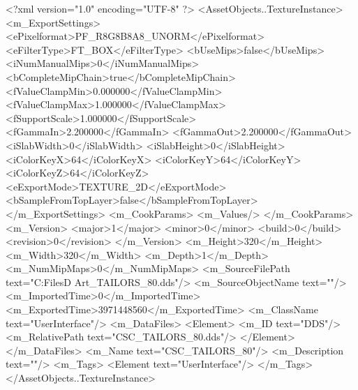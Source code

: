 <?xml version="1.0" encoding="UTF-8" ?>
<AssetObjects..TextureInstance>
	<m_ExportSettings>
		<ePixelformat>PF_R8G8B8A8_UNORM</ePixelformat>
		<eFilterType>FT_BOX</eFilterType>
		<bUseMips>false</bUseMips>
		<iNumManualMips>0</iNumManualMips>
		<bCompleteMipChain>true</bCompleteMipChain>
		<fValueClampMin>0.000000</fValueClampMin>
		<fValueClampMax>1.000000</fValueClampMax>
		<fSupportScale>1.000000</fSupportScale>
		<fGammaIn>2.200000</fGammaIn>
		<fGammaOut>2.200000</fGammaOut>
		<iSlabWidth>0</iSlabWidth>
		<iSlabHeight>0</iSlabHeight>
		<iColorKeyX>64</iColorKeyX>
		<iColorKeyY>64</iColorKeyY>
		<iColorKeyZ>64</iColorKeyZ>
		<eExportMode>TEXTURE_2D</eExportMode>
		<bSampleFromTopLayer>false</bSampleFromTopLayer>
	</m_ExportSettings>
	<m_CookParams>
		<m_Values/>
	</m_CookParams>
	<m_Version>
		<major>1</major>
		<minor>0</minor>
		<build>0</build>
		<revision>0</revision>
	</m_Version>
	<m_Height>320</m_Height>
	<m_Width>320</m_Width>
	<m_Depth>1</m_Depth>
	<m_NumMipMaps>0</m_NumMipMaps>
	<m_SourceFilePath text="C:\Users\Shadow\Desktop\Working Files\2D Art\Quarters\Tailors\CSC_TAILORS_80.dds"/>
	<m_SourceObjectName text=""/>
	<m_ImportedTime>0</m_ImportedTime>
	<m_ExportedTime>3971448560</m_ExportedTime>
	<m_ClassName text="UserInterface"/>
	<m_DataFiles>
		<Element>
			<m_ID text="DDS"/>
			<m_RelativePath text="CSC_TAILORS_80.dds"/>
		</Element>
	</m_DataFiles>
	<m_Name text="CSC_TAILORS_80"/>
	<m_Description text=""/>
	<m_Tags>
		<Element text="UserInterface"/>
	</m_Tags>
</AssetObjects..TextureInstance>

